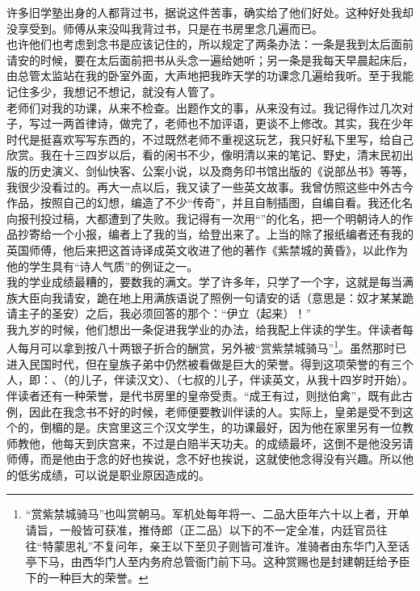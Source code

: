 许多旧学塾出身的人都背过书，据说这件苦事，确实给了他们好处。这种好处我却没享受到。师傅从来没叫我背过书，只是在书房里念几遍而已。\\

也许他们也考虑到念书是应该记住的，所以规定了两条办法：一条是我到太后面前请安的时候，要在太后面前把书从头念一遍给她听；另一条是我每天早晨起床后，由总管太监站在我的卧室外面，大声地把我昨天学的功课念几遍给我听。至于我能记住多少，我想记不想记，就没有人管了。\\

老师们对我的功课，从来不检查。出题作文的事，从来没有过。我记得作过几次对子，写过一两首律诗，做完了，老师也不加评语，更谈不上修改。其实，我在少年时代是挺喜欢写写东西的，不过既然老师不重视这玩艺，我只好私下里写，给自己欣赏。我在十三四岁以后，看的闲书不少，像明清以来的笔记、野史，清末民初出版的历史演义、剑仙快客、公案小说，以及商务印书馆出版的《说部丛书》等等，我很少没看过的。再大一点以后，我又读了一些英文故事。我曾仿照这些中外古今作品，按照自己的幻想，编造了不少“传奇”，并且自制插图，自编自看。我还化名向报刊投过稿，大都遭到了失败。我记得有一次用“”的化名，把一个明朝诗人的作品抄寄给一个小报，编者上了我的当，给登出来了。上当的除了报纸编者还有我的英国师傅，他后来把这首诗译成英文收进了他的著作《紫禁城的黄昏》，以此作为他的学生具有“诗人气质”的例证之一。\\

我的学业成绩最糟的，要数我的满文。学了许多年，只学了一个字，这就是每当满族大臣向我请安，跪在地上用满族语说了照例一句请安的话（意思是：奴才某某跪请主子的圣安）之后，我必须回答的那个：“伊立（起来）！”\\

我九岁的时候，他们想出一条促进我学业的办法，给我配上伴读的学生。伴读者每人每月可以拿到按八十两银子折合的酬赏，另外被“赏紫禁城骑马”\footnote{“赏紫禁城骑马”也叫赏朝马。军机处每年将一、二品大臣年六十以上者，开单请旨，一般皆可获准，推侍郎（正二品）以下的不一定全准，内廷官员往往“特蒙思礼”不复问年，亲王以下至贝子则皆可准许。准骑者由东华门入至话亭下马，由西华门人至内务府总管衙门前下马。这种赏赐也是封建朝廷给予臣下的一种巨大的荣誉。}。虽然那时已进入民国时代，但在皇族子弟中仍然被看做是巨大的荣誉。得到这项荣誉的有三个人，即：、（的儿子，伴读汉文）、（七叔的儿子，伴读英文，从我十四岁时开始）。伴读者还有一种荣誉，是代书房里的皇帝受责。“成王有过，则挞伯禽”，既有此古例，因此在我念书不好的时候，老师便要教训伴读的人。实际上，皇弟是受不到这个的，倒楣的是。庆宫里这三个汉文学生，的功课最好，因为他在家里另有一位教师教他，他每天到庆宫来，不过是白赔半天功夫。的成绩最坏，这倒不是他没另请师傅，而是他由于念的好也挨说，念不好也挨说，这就使他念得没有兴趣。所以他的低劣成绩，可以说是职业原因造成的。\\

